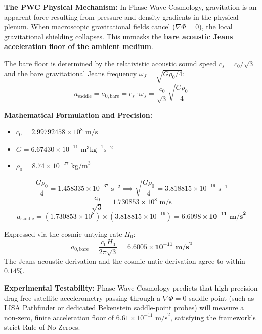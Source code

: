 \documentclass[11pt,a4paper]{article}
\begin{document}
\textbf{The PWC Physical Mechanism:}  
In Phase Wave Cosmology, gravitation is an apparent force resulting from pressure and density gradients in the physical plenum. When macroscopic gravitational fields cancel ($\nabla\Phi = 0$), the local gravitational shielding collapses. This unmasks the \textbf{bare acoustic Jeans acceleration floor of the ambient medium}.

The bare floor is determined by the relativistic acoustic sound speed $c_s = c_0/\sqrt{3}$ and the bare gravitational Jeans frequency $\omega_J = \sqrt{G\rho_0/4}$:
\begin{equation}
a_{\text{saddle}} = a_{0,\text{bare}} = c_s \cdot \omega_J = \frac{c_0}{\sqrt{3}} \sqrt{\frac{G\rho_0}{4}}
\label{eq:a_saddle_jeans}
\end{equation}

\textbf{Mathematical Formulation and Precision:}  
\begin{itemize}
    \item $c_0 = 2.99792458 \times 10^8\text{ m/s}$
    \item $G = 6.67430 \times 10^{-11}\text{ m}^3\text{kg}^{-1}\text{s}^{-2}$
    \item $\rho_0 = 8.74 \times 10^{-27}\text{ kg/m}^3$
\end{itemize}
\begin{equation}
\frac{G \rho_0}{4} = 1.458335 \times 10^{-37}\text{ s}^{-2} \implies \sqrt{\frac{G \rho_0}{4}} = 3.818815 \times 10^{-19}\text{ s}^{-1}
\end{equation}
\begin{equation}
\frac{c_0}{\sqrt{3}} = 1.730853 \times 10^8\text{ m/s}
\end{equation}
\begin{equation}
a_{\text{saddle}} = (1.730853 \times 10^8) \times (3.818815 \times 10^{-19}) = \mathbf{6.6098 \times 10^{-11}\text{ m/s}^2}
\end{equation}

Expressed via the cosmic untying rate $H_0$:
\begin{equation}
a_{0,\text{bare}} = \frac{c_0 H_0}{2\pi\sqrt{3}} = \mathbf{6.6005 \times 10^{-11}\text{ m/s}^2}
\end{equation}
The Jeans acoustic derivation and the cosmic untie derivation agree to within $0.14\%$.

\textbf{Experimental Testability:}  
Phase Wave Cosmology predicts that high-precision drag-free satellite accelerometry passing through a $\nabla\Phi = 0$ saddle point (such as LISA Pathfinder or dedicated Bekenstein saddle-point probes) will measure a non-zero, finite acceleration floor of $6.61 \times 10^{-11}\text{ m/s}^2$, satisfying the framework's strict Rule of No Zeroes.
\end{document}
